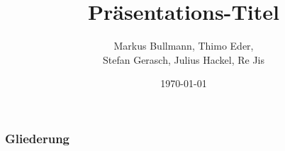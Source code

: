\documentclass[aspectratio=169,babel]{beamer}
\title{Präsentations-Titel}
\author{Markus Bullmann, Thimo Eder, \\ Stefan Gerasch, Julius Hackel, Re Jis}
\date{\today}
\begin{document}
    \maketitle
    \begin{frame}
        \frametitle{Gliederung}
        \tableofcontents
    \end{frame}
    
    
    
    
    
    
\end{document}
